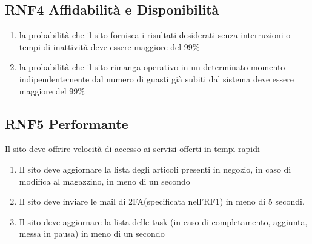 \documentclass{report}
\begin{document}
\subsection*{RNF4 Affidabilità e Disponibilità}
\begin{enumerate}
	\item la probabilità che il sito fornisca i risultati desiderati senza interruzioni o tempi di inattività deve essere maggiore del 99\%
	\item la probabilità che il sito rimanga operativo in un determinato momento indipendentemente dal numero di guasti già subiti dal sistema deve essere maggiore del 99\%
	 
\end{enumerate}
\subsection*{RNF5 Performante}
Il sito deve offrire velocità di accesso ai servizi offerti in tempi rapidi
\begin{enumerate}
	\item Il sito deve aggiornare la lista degli articoli presenti in negozio, in caso di modifica al magazzino, in meno di un secondo
	\item Il sito deve inviare le mail di 2FA(specificata nell'RF1) in meno di 5 secondi.
	\item Il sito deve aggiornare la lista delle task (in caso di completamento, aggiunta, messa in pausa) in meno di un secondo 
\end{enumerate}
\end{document}
